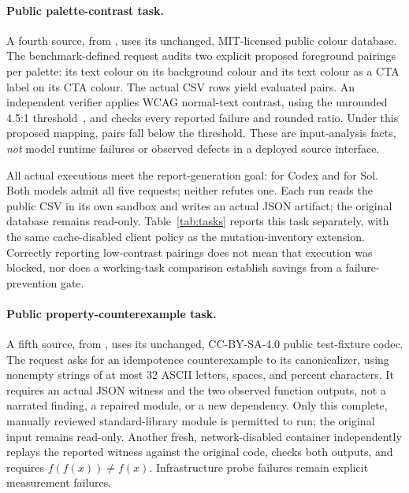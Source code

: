 \paragraph{Public palette-contrast task.}
A fourth source,  from
, uses its unchanged, MIT-licensed public
colour database. The benchmark-defined request audits two explicit proposed
foreground pairings per palette: its text colour on its background colour
and its text colour as a CTA label on its CTA colour. The
\PaletteRows{} actual CSV rows yield \PalettePairs{} evaluated pairs.
An independent verifier applies WCAG normal-text contrast, using the
unrounded 4.5:1 threshold~\cite{wcag22}, and checks every reported failure
and rounded ratio. Under this proposed mapping, \PaletteFailingPairs{}
pairs fall below the threshold. These are input-analysis facts, \emph{not}
model runtime failures or observed defects in a deployed source interface.

All \PaletteExecutions{} actual executions meet the report-generation
goal: \PaletteCodexAchieved{} for Codex and \PaletteSolAchieved{} for Sol.
Both models admit all five requests; neither refutes one. Each run reads
the public CSV in its own sandbox and writes an actual JSON artifact;
the original database remains read-only. Table~\ref{tab:tasks}
reports this task separately, with the same cache-disabled client policy
as the mutation-inventory extension. Correctly reporting low-contrast
pairings does not mean that execution was blocked, nor does a working-task
comparison establish savings from a failure-prevention gate.

\paragraph{Public property-counterexample task.}
A fifth source,  from ,
uses its unchanged, CC-BY-SA-4.0 public test-fixture codec. The request asks
for an idempotence counterexample to its canonicalizer, using nonempty
strings of at most 32 ASCII letters, spaces, and percent characters.
It requires an actual JSON witness and the two observed function outputs,
not a narrated finding, a repaired module, or a new dependency. Only this
complete, manually reviewed standard-library module is permitted to run;
the original input remains read-only. Another fresh, network-disabled
container independently replays the reported witness against the original
code, checks both outputs, and requires $f(f(x))\ne f(x)$. Infrastructure
probe failures remain explicit measurement failures.

